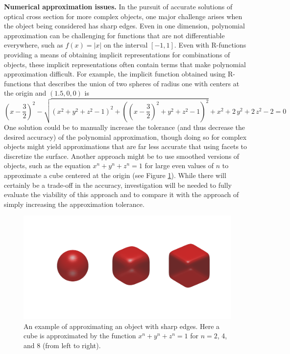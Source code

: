 \documentclass[11pt]{amsart}
\theoremstyle{definition}
\begin{document}
\textbf{Numerical approximation issues.}
In the pursuit of accurate solutions of optical cross section for more complex
objects, one major challenge arises when the object being considered has sharp
edges. Even in one dimension, polynomial approximation can be challenging for
functions that are not differentiable everywhere, such as $f(x) = |x|$ on the
interval $[-1,1]$. Even with R-functions providing a means of obtaining
implicit representations for combinations of objects, these implicit
representations often contain terms that make polynomial approximation
difficult. For example, the implicit function obtained using R-functions that
describes the union of two spheres of radius one with centers at the origin and
$(1.5,0,0)$ is
\[{\left(x-\frac{3}{2}\right)}^2-\sqrt{{\left(x^2+y^2+z^2-1\right)}^2+{\left({\left(x-\frac{3}{2}\right)}^2+y^2+z^2-1\right)}^2}+x^2+2\,y^2+2\,z^2-2 = 0
\]
One solution could be to manually increase the tolerance (and thus decrease the
desired accuracy) of the polynomial approximation, though doing so for complex
objects might yield approximations that are far less accurate that using facets
to discretize the surface. Another approach might be to use smoothed versions
of objects, such as the equation $x^n + y^n + z^n = 1$ for large even values of
$n$ to approximate a cube centered at the origin (see Figure \ref{cubes}).
While there will certainly be a trade-off in the accuracy, investigation will
be needed to fully evaluate the viability of this approach and to compare it
with the approach of simply increasing the approximation tolerance.

\begin{figure}[H]
\includegraphics[width=\linewidth]{./figs/cubes.pdf}
\caption{An example of approximating an object with sharp edges. Here a cube is approximated by the function $x^n + y^n + z^n = 1$ for $n = 2$, 4, and 8 (from left to right).}
\label{cubes}
\end{figure}
\end{document}
